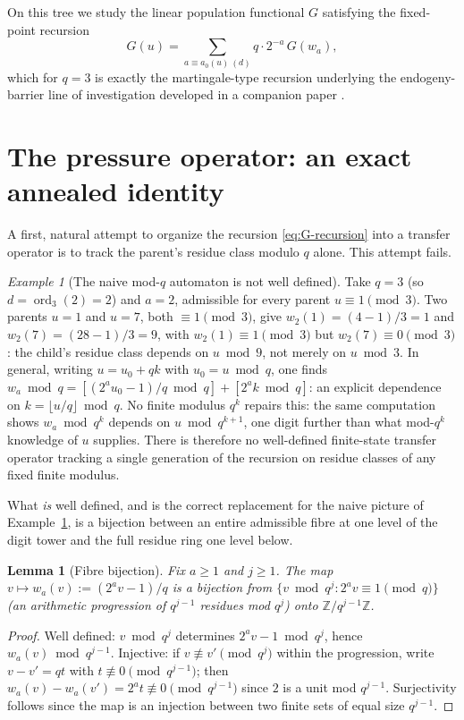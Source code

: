 \documentclass[11pt]{article}
\newtheorem{lemma}[theorem]{Lemma}
\theoremstyle{remark}
\newtheorem{example}[theorem]{Example}
\DeclareMathOperator{\ord}{ord}
\begin{document}
On this tree we study the linear population functional $G$ satisfying
the fixed-point recursion
\begin{equation}\label{eq:G-recursion}
  G(u) = \sum_{a \equiv a_0(u) \ (d)} q\cdot 2^{-a}\, G(w_a),
\end{equation}
which for $q=3$ is exactly the martingale-type recursion underlying the
endogeny-barrier line of investigation developed in a companion paper
\cite{BarrierCompanion}.

\section{The pressure operator: an exact annealed identity}
\label{sec:pressure}

A first, natural attempt to organize the recursion \eqref{eq:G-recursion}
into a transfer operator is to track the parent's residue class modulo
$q$ alone. This attempt fails.

\begin{example}[The naive mod-$q$ automaton is not well defined]
\label{ex:naive-fails}
Take $q=3$ (so $d=\ord_3(2)=2$) and $a=2$, admissible for every parent
$u\equiv1\pmod3$. Two parents $u=1$ and $u=7$, both $\equiv1\pmod3$,
give $w_2(1)=(4-1)/3=1$ and $w_2(7)=(28-1)/3=9$, with $w_2(1)\equiv
1\pmod3$ but $w_2(7)\equiv0\pmod3$: the child's residue class depends
on $u\bmod9$, not merely on $u\bmod3$. In general, writing
$u=u_0+qk$ with $u_0=u\bmod q$, one finds $w_a\bmod q =
[(2^au_0-1)/q\bmod q] + [2^ak\bmod q]$: an explicit dependence on
$k=\lfloor u/q\rfloor\bmod q$. No finite modulus $q^k$ repairs this:
the same computation shows $w_a\bmod q^k$ depends on $u\bmod q^{k+1}$,
one digit further than what mod-$q^k$ knowledge of $u$ supplies. There
is therefore no well-defined finite-state transfer operator tracking a
single generation of the recursion on residue classes of any fixed
finite modulus.
\end{example}

What \emph{is} well defined, and is the correct replacement for the
naive picture of Example~\ref{ex:naive-fails}, is a bijection between
an entire admissible fibre at one level of the digit tower and the
full residue ring one level below.

\begin{lemma}[Fibre bijection]\label{lem:fibre-bijection}
Fix $a\ge1$ and $j\ge1$. The map $v\mapsto w_a(v):=(2^av-1)/q$ is a
bijection from $\{v\bmod q^j : 2^av\equiv1\!\!\pmod q\}$ (an arithmetic
progression of $q^{j-1}$ residues mod $q^j$) onto
$\mathbb{Z}/q^{j-1}\mathbb{Z}$.
\end{lemma}
\begin{proof}
Well defined: $v\bmod q^j$ determines $2^av-1\bmod q^j$, hence
$w_a(v)\bmod q^{j-1}$. Injective: if $v\not\equiv v'\pmod{q^j}$ within
the progression, write $v-v'=qt$ with $t\not\equiv0\pmod{q^{j-1}}$;
then $w_a(v)-w_a(v')=2^at\not\equiv0\pmod{q^{j-1}}$ since $2$ is a unit
mod $q^{j-1}$. Surjectivity follows since the map is an injection
between two finite sets of equal size $q^{j-1}$.
\end{proof}
\end{document}
